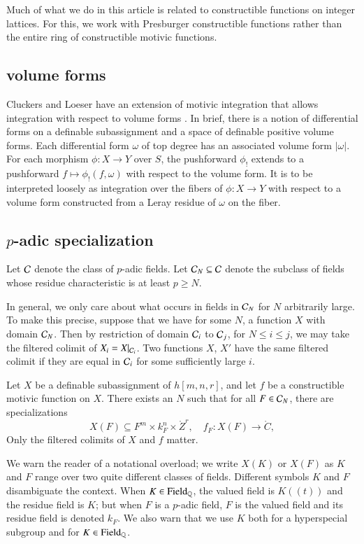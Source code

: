 Much of what we do in this article is related to constructible functions on integer lattices.  For this, we work with Presburger
constructible functions rather than the entire ring of constructible motivic functions.

\subsection{volume forms}

Cluckers and Loeser have an extension of motivic integration that allows integration with respect to volume
forms \cite[\S8]{cluckers2008constructible}.  In brief, there is a notion of differential forms on a definable subassignment
and a space of definable positive volume forms.  Each differential form $\omega$ of top degree has an associated volume
form $|\omega|$.   For each morphism $\phi:X\to Y$ over $S$, the pushforward $\phi_!$ extends to a pushforward
$f \mapsto \phi_!(f,\omega)$ with respect to the volume form.   It is to be interpreted loosely as integration over
the fibers of $\phi:X\to Y$ with respect to a volume form constructed from a Leray residue of $\omega$ on the fiber.

\subsection{$p$-adic specialization}

Let $\mathcal C$ denote the class of $p$-adic fields.
Let $\mathcal C_N\subseteq \mathcal C$ denote the subclass of fields whose residue characteristic is at least $p\ge N$.

In general, we only care about what occurs in fields in $\mathcal C_N$ for $N$ arbitrarily large.
To make this precise, suppose that we have for some $N$, a function $X$ with domain $\mathcal C_N$.
Then by restriction of domain $\mathcal C_i$ to $\mathcal C_{j}$, for $N\le i\le j$, we may take the filtered colimit of $X_i=X|_{\mathcal C_i}$.
Two functions $X$, $X'$ have the same filtered colimit if they are equal in $\mathcal C_i$ for some sufficiently large $i$.

Let $X$ be a definable subassignment of $h[m,n,r]$, and let $f$ be a constructible motivic function on $X$.   There exists
an $N$ such that for all $F\in \mathcal C_N$, there are specializations
\[
X(F)\subseteq F^m\times k_F^n\times \ring{Z}^r,  \quad f_F: X(F) \to\ring{C},
\]
Only the  filtered colimits of $X$ and $f$ matter.

We warn the reader of a notational overload; we write $X(K)$ or $X(F)$ as $K$ and $F$ range over two quite different
classes of fields.  Different symbols $K$ and $F$  disambiguate the context.
When $K\in {\operatorname{Field}}_{\mathbb{Q}}$, the valued field is $K((t))$ and the residue field is $K$; but when $F$ is a $p$-adic field, $F$
is the valued field and its residue field is denoted $k_F$.  We also warn that
we use $K$ both for a hyperspecial subgroup and for $K\in{\operatorname{Field}}_{\mathbb{Q}}$.

